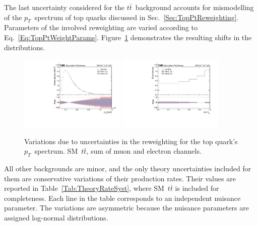 The last uncertainty considered for the $t\bar t$~background accounts for mismodelling of the $p_{T}$~spectrum of top quarks discussed in Sec.~\ref{Sec:TopPtReweighting}.
Parameters of the involved reweighting are varied according to Eq.~\ref{Eq:TopPtWeightParams}.
Figure~\ref{Fig:SystTopPt} demonstrates the resulting shifts in the distributions.

\begin{figure}
  \centering
  \includegraphics[width=0.45\textwidth]{fig/chapt7/syst/impacts/MassTT/topPt.pdf}
  \includegraphics[width=0.45\textwidth]{fig/chapt7/syst/impacts/CosTopLepTT/topPt.pdf}
  \caption{Variations due to uncertainties in the reweighting for the top quark's $p_T$~spectrum. SM~$t\bar t$, sum of muon and electron channels.}
  \label{Fig:SystTopPt}
\end{figure}

All other backgrounds are minor, and the only theory uncertainties included for them are conservative variations of their production rates.
Their values are reported in Table~\ref{Tab:TheoryRateSyst}, where SM~$t\bar t$ is included for completeness.
Each line in the table corresponds to an independent nuisance parameter.
The variations are asymmetric because the nuisance parameters are assigned log-normal distributions.

